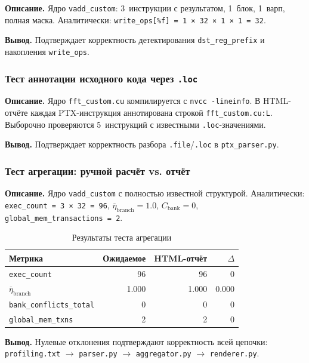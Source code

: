 \textbf{Описание.}
Ядро \texttt{vadd\_custom}: 3~инструкции с результатом, 1~блок, 1~варп,
полная маска. Аналитически: \texttt{write\_ops[\%f] = 1 × 32 × 1 × 1 = 32}.

\textbf{Вывод.}
Подтверждает корректность детектирования \texttt{dst\_reg\_prefix}
и накопления \texttt{write\_ops}.

\subsubsection{Тест аннотации исходного кода через \texttt{.loc}}

\textbf{Описание.}
Ядро \texttt{fft\_custom.cu} компилируется с \texttt{nvcc -lineinfo}.
В HTML-отчёте каждая PTX-инструкция аннотирована строкой
\texttt{fft\_custom.cu:L}. Выборочно проверяются 5~инструкций
с известными \texttt{.loc}-значениями.

\textbf{Вывод.}
Подтверждает корректность разбора \texttt{.file}/\texttt{.loc}
в \texttt{ptx\_parser.py}.

\subsubsection{Тест агрегации: ручной расчёт vs. отчёт}

\textbf{Описание.}
Ядро \texttt{vadd\_custom} с полностью известной структурой.
Аналитически: \texttt{exec\_count = 3~×~32 = 96},
$\overline{\eta}_{\mathrm{branch}} = 1.0$, $C_{\mathrm{bank}} = 0$,
\texttt{global\_mem\_transactions~= 2}.

\begin{table}[h]
  \caption{Результаты теста агрегации}
  \label{tab:aggregation_test}
  \centering
  \begin{tabular}{lrrr}
    \toprule
    \textbf{Метрика} & \textbf{Ожидаемое} & \textbf{HTML-отчёт} & $\Delta$ \\
    \midrule
    \texttt{exec\_count}          & 96    & 96    & 0 \\
    $\overline{\eta}_{\mathrm{branch}}$  & 1.000 & 1.000 & 0.000 \\
    \texttt{bank\_conflicts\_total} & 0     & 0     & 0 \\
    \texttt{global\_mem\_txns}     & 2     & 2     & 0 \\
    \bottomrule
  \end{tabular}
\end{table}

\textbf{Вывод.}
Нулевые отклонения подтверждают корректность всей цепочки:
\texttt{profiling.txt} $\to$ \texttt{parser.py} $\to$
\texttt{aggregator.py} $\to$ \texttt{renderer.py}.

\newpage

